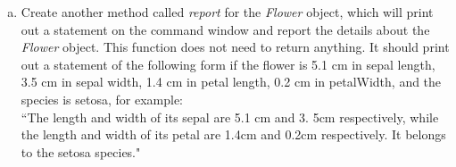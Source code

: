 \documentclass[11pt]{article}
\begin{document}
\begin{enumerate}[a.]
	\item Create another method called \textit{report} for the \textit{Flower} object,
	which will print out a statement on the command window and report
	the details about the \textit{Flower} object.
	This function does not need to return anything.
	It should print out a statement of the following form if the flower
	is 5.1 cm in sepal length, 3.5 cm in sepal width, 1.4 cm in petal length,
	0.2 cm in petalWidth, and the species is setosa, for example: \\
	``The length and width of its sepal are 5.1 cm and 3. 5cm respectively,
	while the length and width of its petal are 1.4cm and 0.2cm respectively.
	It belongs to the setosa species."
\end{enumerate}
\end{document}
